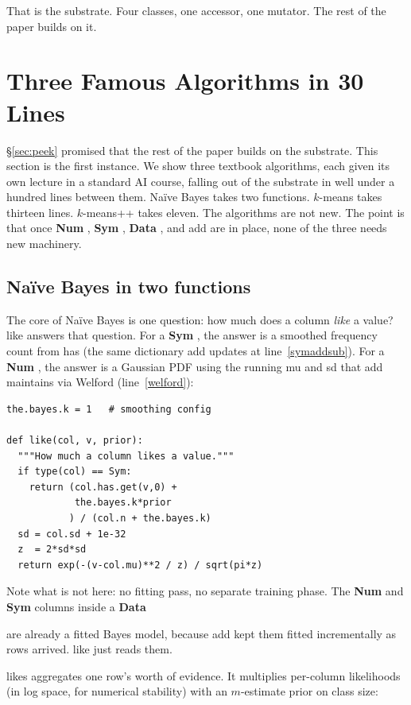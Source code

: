 \documentclass[AMA,STIX2COL]{WileyNJDv5}
\newcommand{\cls}[1]{%
  \setlength{\fboxsep}{1.5pt}%
  \colorbox{clsbg}{\sffamily\bfseries{#1}}%
}
\begin{document}
\medskip

That is the substrate. Four classes, one accessor, one
mutator. The rest of the paper builds on it.


\section{Three Famous Algorithms in 30 Lines}\label{sec:famous}

\S\ref{sec:peek} promised that the rest of the paper builds on
the substrate. This section is the first instance. We show
three textbook algorithms, each given its own lecture in a
standard AI course, falling out of the substrate in well under
a hundred lines between them. Naïve Bayes takes two functions.
$k$-means takes thirteen lines. $k$-means++ takes eleven. The
algorithms are not new. The point is that once \cls{Num},
\cls{Sym}, \cls{Data}, and \textsf{add} are in place, none of
the three needs new machinery.

\subsection{Naïve Bayes in two functions}

The core of Naïve Bayes is one question: how much does a column
{\em like} a value? \textsf{like} answers that question. For a
\cls{Sym}, the answer is a smoothed frequency count from
\textsf{has} (the same dictionary \textsf{add} updates at
line~\ref{symaddsub}). For a \cls{Num}, the answer is a Gaussian
PDF using the running \textsf{mu} and \textsf{sd} that
\textsf{add} maintains via Welford (line~\ref{welford}):

\begin{verbatim}
the.bayes.k = 1   # smoothing config

def like(col, v, prior):
  """How much a column likes a value."""
  if type(col) == Sym:
    return (col.has.get(v,0) +
            the.bayes.k*prior
           ) / (col.n + the.bayes.k)
  sd = col.sd + 1e-32
  z  = 2*sd*sd
  return exp(-(v-col.mu)**2 / z) / sqrt(pi*z)
\end{verbatim}

Note what is not here: no fitting pass, no separate training
phase. The \cls{Num} and \cls{Sym} columns inside a \cls{Data}
are already a fitted Bayes model, because \textsf{add} kept
them fitted incrementally as rows arrived. \textsf{like} just
reads them.

\textsf{likes} aggregates one row's worth of evidence. It
multiplies per-column likelihoods (in log space, for numerical
stability) with an $m$-estimate prior on class size:
\end{document}
